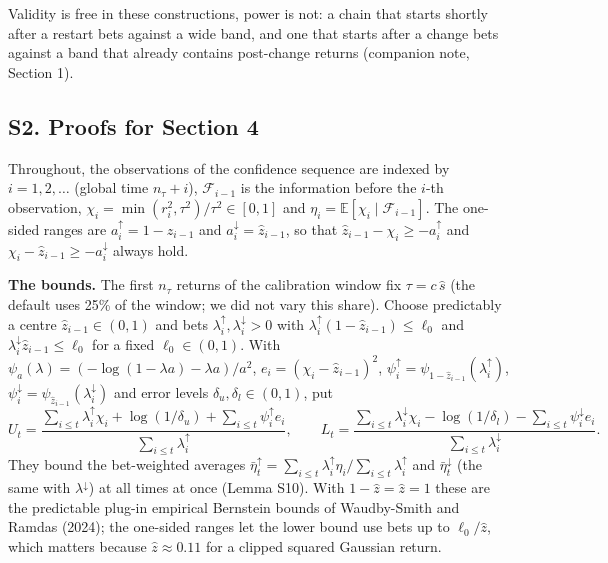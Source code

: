 \documentclass[
]{article}
\begin{document}
Validity is free in these constructions, power is not: a chain that
starts shortly after a restart bets against a wide band, and one that
starts after a change bets against a band that already contains
post-change returns (companion note, Section 1).

\hypertarget{s2.-proofs-for-section-4}{%
\subsection{S2. Proofs for Section 4}\label{s2.-proofs-for-section-4}}

Throughout, the observations of the confidence sequence are indexed by
\(i = 1, 2, \dots\) (global time \(n_\tau + i\)), \(\mathcal{F}_{i-1}\)
is the information before the \(i\)-th observation,
\(\chi_i = \min(r_i^2, \tau^2)/\tau^2 \in [0, 1]\) and
\(\eta_i = \mathbb{E}[\chi_i \mid \mathcal{F}_{i-1}]\). The one-sided
ranges are \(a_i^{\uparrow} = 1 - \hat z_{i-1}\) and
\(a_i^{\downarrow} = \hat z_{i-1}\), so that
\(\hat z_{i-1} - \chi_i \ge -a_i^{\uparrow}\) and
\(\chi_i - \hat z_{i-1} \ge -a_i^{\downarrow}\) always hold.

\textbf{The bounds.} The first \(n_\tau\) returns of the calibration
window fix \(\tau = c\,\hat s\) (the default uses 25\% of the window; we
did not vary this share). Choose predictably a centre
\(\hat z_{i-1} \in (0, 1)\) and bets
\(\lambda_i^{\uparrow}, \lambda_i^{\downarrow} > 0\) with
\(\lambda_i^{\uparrow}(1 - \hat z_{i-1}) \le \ell_0\) and
\(\lambda_i^{\downarrow}\hat z_{i-1} \le \ell_0\) for a fixed
\(\ell_0 \in (0, 1)\). With
\(\psi_a(\lambda) = (-\log(1 - \lambda a) - \lambda a)/a^2\),
\(e_i = (\chi_i - \hat z_{i-1})^2\),
\(\psi_i^{\uparrow} = \psi_{1-\hat z_{i-1}}(\lambda_i^{\uparrow})\),
\(\psi_i^{\downarrow} = \psi_{\hat z_{i-1}}(\lambda_i^{\downarrow})\)
and error levels \(\delta_u, \delta_l \in (0, 1)\), put \[
U_t = \frac{\sum_{i \le t} \lambda_i^{\uparrow} \chi_i + \log(1/\delta_u) + \sum_{i \le t} \psi_i^{\uparrow} e_i}{\sum_{i \le t} \lambda_i^{\uparrow}}, \qquad
L_t = \frac{\sum_{i \le t} \lambda_i^{\downarrow} \chi_i - \log(1/\delta_l) - \sum_{i \le t} \psi_i^{\downarrow} e_i}{\sum_{i \le t} \lambda_i^{\downarrow}}.
\] They bound the bet-weighted averages
\(\bar\eta_t^{\uparrow} = \sum_{i \le t}\lambda_i^{\uparrow}\eta_i / \sum_{i \le t}\lambda_i^{\uparrow}\)
and \(\bar\eta_t^{\downarrow}\) (the same with \(\lambda^{\downarrow}\))
at all times at once (Lemma S10). With \(1 - \hat z = \hat z = 1\) these
are the predictable plug-in empirical Bernstein bounds of Waudby-Smith
and Ramdas (2024); the one-sided ranges let the lower bound use bets up
to \(\ell_0/\hat z\), which matters because \(\hat z \approx 0.11\) for
a clipped squared Gaussian return.
\end{document}
